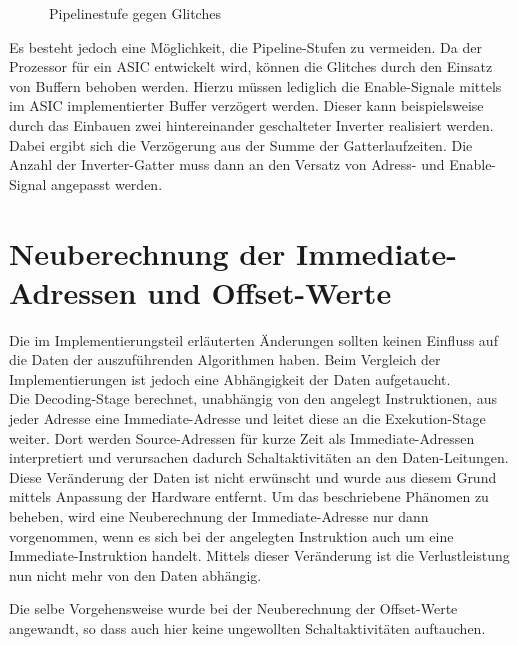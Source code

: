 \begin{figure}[H] 
	\centering
	
	\caption{Pipelinestufe gegen Glitches}
	\label{fig:glitches_pipeline}
\end{figure}


Es besteht jedoch eine Möglichkeit, die Pipeline-Stufen zu vermeiden.
Da der Prozessor für ein ASIC entwickelt wird, können die Glitches durch den Einsatz von Buffern behoben werden. Hierzu müssen lediglich die Enable-Signale mittels im ASIC implementierter Buffer verzögert werden. Dieser kann beispielsweise durch das Einbauen zwei hintereinander geschalteter Inverter realisiert werden. Dabei ergibt sich die Verzögerung aus der Summe der Gatterlaufzeiten. Die Anzahl der Inverter-Gatter muss dann an den Versatz von Adress- und Enable-Signal angepasst werden.

\section{Neuberechnung der Immediate-Adressen und Offset-Werte}
Die im Implementierungsteil erläuterten Änderungen sollten keinen Einfluss auf die Daten der auszuführenden Algorithmen haben. Beim Vergleich der Implementierungen ist jedoch eine Abhängigkeit der Daten aufgetaucht.\\
Die Decoding-Stage berechnet, unabhängig von den angelegt Instruktionen, aus jeder Adresse eine Immediate-Adresse und leitet diese an die Exekution-Stage weiter. Dort werden Source-Adressen für kurze Zeit als Immediate-Adressen interpretiert und verursachen dadurch Schaltaktivitäten an den Daten-Leitungen. Diese Veränderung der Daten ist nicht erwünscht und wurde aus diesem Grund mittels Anpassung der Hardware entfernt. Um das beschriebene Phänomen zu beheben, wird eine Neuberechnung der Immediate-Adresse nur dann vorgenommen, wenn es sich bei der angelegten Instruktion auch um eine Immediate-Instruktion handelt.
Mittels dieser Veränderung ist die Verlustleistung nun nicht mehr von den Daten abhängig.

Die selbe Vorgehensweise wurde bei der Neuberechnung der Offset-Werte angewandt, so dass auch hier keine ungewollten Schaltaktivitäten auftauchen.



